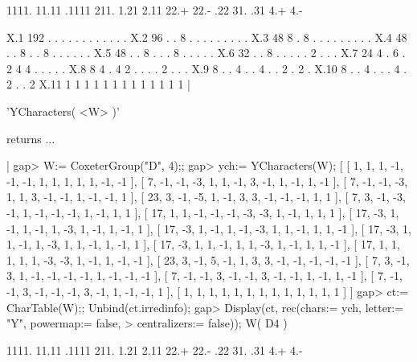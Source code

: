             1111. 11.11 .1111 211. 1.21 2.11 22.+ 22.- .22 31. .31 4.+ 4.-
    
    X.1       192     .     .    .    .    .    .    .   .   .   .   .   .
    X.2        96     .     .    8    .    .    .    .   .   .   .   .   .
    X.3        48     8     .    8    .    .    .    .   .   .   .   .   .
    X.4        48     .     .    8    .    .    8    .   .   .   .   .   .
    X.5        48     .     .    8    .    .    .    8   .   .   .   .   .
    X.6        32     .     .    8    .    .    .    .   .   2   .   .   .
    X.7        24     4     .    6    .    2    4    4   .   .   .   .   .
    X.8         8     4     .    4    2    .    .    .   .   2   .   .   .
    X.9         8     .     .    4    .    .    4    .   .   2   .   2   .
    X.10        8     .     .    4    .    .    .    4   .   2   .   .   2
    X.11        1     1     1    1    1    1    1    1   1   1   1   1   1
|



'YCharacters( <W> )'

returns  ...

|    gap> W:= CoxeterGroup("D", 4);;
    gap> ych:= YCharacters(W);
    [ [ 1, 1, 1, -1, -1, -1, 1, 1, 1, 1, 1, -1, -1 ], 
      [ 7, -1, -1, -3, 1, 1, -1, 3, -1, 1, -1, 1, -1 ], 
      [ 7, -1, -1, -3, 1, 1, 3, -1, -1, 1, -1, -1, 1 ], 
      [ 23, 3, -1, -5, 1, -1, 3, 3, -1, -1, -1, 1, 1 ], 
      [ 7, 3, -1, -3, -1, 1, -1, -1, -1, 1, -1, 1, 1 ], 
      [ 17, 1, 1, -1, -1, -1, -3, -3, 1, -1, 1, 1, 1 ], 
      [ 17, -3, 1, -1, 1, -1, 1, -3, 1, -1, 1, -1, 1 ], 
      [ 17, -3, 1, -1, 1, -1, -3, 1, 1, -1, 1, 1, -1 ], 
      [ 17, -3, 1, 1, -1, 1, -3, 1, 1, -1, 1, -1, 1 ], 
      [ 17, -3, 1, 1, -1, 1, 1, -3, 1, -1, 1, 1, -1 ], 
      [ 17, 1, 1, 1, 1, 1, -3, -3, 1, -1, 1, -1, -1 ], 
      [ 23, 3, -1, 5, -1, 1, 3, 3, -1, -1, -1, -1, -1 ], 
      [ 7, 3, -1, 3, 1, -1, -1, -1, -1, 1, -1, -1, -1 ], 
      [ 7, -1, -1, 3, -1, -1, 3, -1, -1, 1, -1, 1, -1 ], 
      [ 7, -1, -1, 3, -1, -1, -1, 3, -1, 1, -1, -1, 1 ], 
      [ 1, 1, 1, 1, 1, 1, 1, 1, 1, 1, 1, 1, 1 ] ]
    gap> ct:= CharTable(W);;  Unbind(ct.irredinfo);
    gap> Display(ct, rec(chars:= ych, letter:= "Y", powermap:= false,
    >                    centralizers:= false));
    W( D4 )
    
            1111. 11.11 .1111 211. 1.21 2.11 22.+ 22.- .22 31. .31 4.+ 4.-
    
